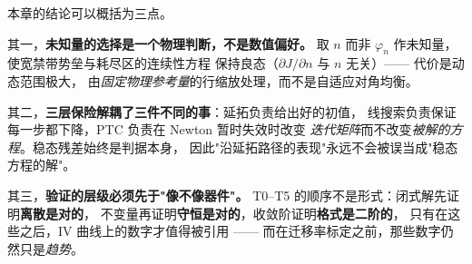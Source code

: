 本章的结论可以概括为三点。

其一，\textbf{未知量的选择是一个物理判断，不是数值偏好。}
取 $n$ 而非 $\varphi_n$ 作未知量，使宽禁带势垒与耗尽区的连续性方程
保持良态（$\partial J/\partial n$ 与 $n$ 无关）—— 代价是动态范围极大，
由\emph{固定物理参考量}的行缩放处理，而不是自适应对角均衡。

其二，\textbf{三层保险解耦了三件不同的事}：延拓负责给出好的初值，
线搜索负责保证每一步都下降，PTC 负责在 Newton 暂时失效时改变
\emph{迭代矩阵}而不改变\emph{被解的方程}。稳态残差始终是判据本身，
因此"沿延拓路径的表现"永远不会被误当成"稳态方程的解"。

其三，\textbf{验证的层级必须先于"像不像器件"。}
T0--T5 的顺序不是形式：闭式解先证明\textbf{离散是对的}，
不变量再证明\textbf{守恒是对的}，收敛阶证明\textbf{格式是二阶的}，
只有在这些之后，IV 曲线上的数字才值得被引用 ——
而在迁移率标定之前，那些数字仍然只是\emph{趋势}。

\cleardoublepage
